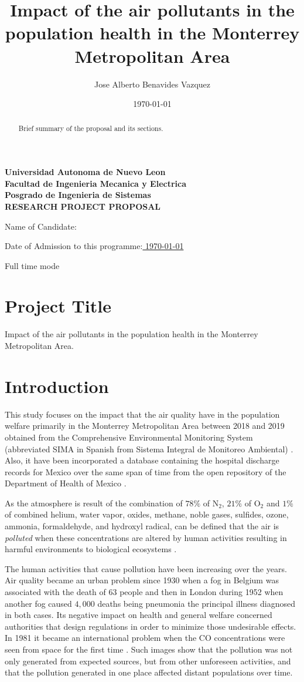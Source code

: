 \documentclass[
  11pt,
  a4paper,
  oneside
]{article}
\author{Jose Alberto Benavides Vazquez}
\date{\today}
\title{Impact of the air pollutants in the population health in the Monterrey Metropolitan Area}
\newcommand{\titlepart}{\thispagestyle{empty}
\pdfbookmark[0]{Front Page}{Front Page}
\label{sec:frontpage}
\begin{center}
\textbf{Universidad Autonoma de Nuevo Leon\\
Facultad de Ingenieria Mecanica y Electrica\\
Posgrado de Ingenieria de Sistemas\\
\vspace{3ex}
RESEARCH PROJECT PROPOSAL}
\end{center}

\vspace{6ex}

Name of Candidate:\uline{
\phantom{xxxxxxxxxxxxxxxxxxx}
\theauthor
\hfill\phantom{x}}

\vspace{3ex}

Date of Admission to this programme:\uline{
\phantom{xxxxx}
\admissionDate
\hfill\phantom{x}}

\vspace{3ex}

\studyTimeMode

\leftskip=0.32in}
\newcommand{\admissionDate}{\today}
\newcommand{\studyTimeMode}{Full time mode}
\begin{document}
\titlepart

\begin{abstract}
    Brief summary of the proposal and its sections.
\end{abstract}

\section{Project Title}
Impact of the air pollutants in the population health in the Monterrey Metropolitan Area.

\section{Introduction}
This study focuses on the impact that the air quality have in the population welfare primarily in the Monterrey Metropolitan Area between 2018 and 2019 obtained from the Comprehensive Environmental Monitoring System (abbreviated SIMA in Spanish from Sistema Integral de Monitoreo Ambiental) \citep{aireNL}. Also, it have been incorporated a database containing the hospital discharge records for Mexico over the same span of time from the open repository of the Department of Health of Mexico \cite{mexGobSS2020}.

As the atmosphere is result of the combination of $78\%$ of N$_2$,  $21\%$ of O$_2$ and $1\%$ of combined helium, water vapor, oxides, methane, noble gases, sulfides, ozone, ammonia, formaldehyde, and hydroxyl radical, can be defined that the air is \textit{polluted} when these concentrations are altered by human activities resulting in harmful environments to biological ecosystems \citep{thadEA2015}.

The human activities that cause pollution have been increasing over the years. Air quality became an urban problem since 1930 when a fog in Belgium was associated with the death of $63$ people and then in London during 1952 \citep{firket1936} when another fog caused $4,000$ deaths \citep{logan1953} being pneumonia the principal illness diagnosed in both cases. Its negative impact on health and general welfare concerned authorities that design regulations in order to minimize those undesirable effects. In 1981 it became an international problem when the CO concentrations were seen from space for the first time \citep{akimoto2003}. Such images show that the pollution was not only generated from expected sources, but from other unforeseen activities, and that the pollution generated in one place affected distant populations over time. 
\end{document}
